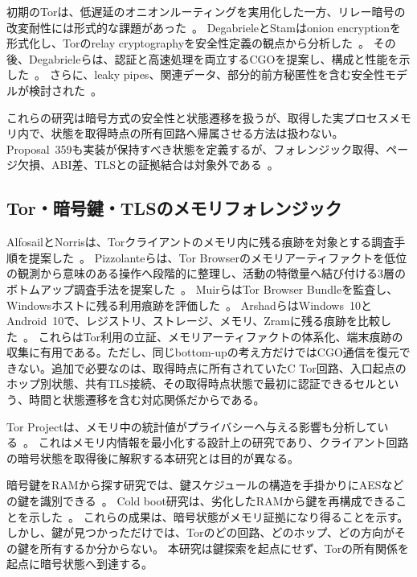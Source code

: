 \documentclass[10pt,a4paper]{ltjsarticle}
\begin{document}
初期のTorは、低遅延のオニオンルーティングを実用化した一方、リレー暗号の改変耐性には形式的な課題があった~\cite{dingledine2004tor}。
DegabrieleとStamはonion encryptionを形式化し、Torのrelay cryptographyを安全性定義の観点から分析した~\cite{degabriele2018untagging}。
その後、Degabrieleらは、認証と高速処理を両立するCGOを提案し、構成と性能を示した~\cite{degabriele2025cgo}。
さらに、leaky pipes、関連データ、部分的前方秘匿性を含む安全性モデルが検討された~\cite{degabriele2025secure}。

これらの研究は暗号方式の安全性と状態遷移を扱うが、取得した実プロセスメモリ内で、状態を取得時点の所有回路へ帰属させる方法は扱わない。
Proposal~359も実装が保持すべき状態を定義するが、フォレンジック取得、ページ欠損、ABI差、TLSとの証拠結合は対象外である~\cite{torproposal359}。

\subsection{Tor・暗号鍵・TLSのメモリフォレンジック}

AlfosailとNorrisは、Torクライアントのメモリ内に残る痕跡を対象とする調査手順を提案した~\cite{alfosail2021tor}。
Pizzolanteらは、Tor Browserのメモリアーティファクトを低位の観測から意味のある操作へ段階的に整理し、活動の特徴量へ結び付ける3層のボトムアップ調査手法を提案した~\cite{pizzolante2021torbrowser}。
MuirらはTor Browser Bundleを監査し、Windowsホストに残る利用痕跡を評価した~\cite{muir2019forensic}。
ArshadらはWindows~10とAndroid~10で、レジストリ、ストレージ、メモリ、Zramに残る痕跡を比較した~\cite{arshad2021forensic}。
これらはTor利用の立証、メモリアーティファクトの体系化、端末痕跡の収集に有用である。ただし、同じbottom-upの考え方だけではCGO通信を復元できない。追加で必要なのは、取得時点に所有されていたC Tor回路、入口起点のホップ別状態、共有TLS接続、その取得時点状態で最初に認証できるセルという、時間と状態遷移を含む対応関係だからである。

Tor Projectは、メモリ中の統計値がプライバシーへ与える影響も分析している~\cite{tor2017memory}。
これはメモリ内情報を最小化する設計上の研究であり、クライアント回路の暗号状態を取得後に解釈する本研究とは目的が異なる。


暗号鍵をRAMから探す研究では、鍵スケジュールの構造を手掛かりにAESなどの鍵を識別できる~\cite{maartmannmoe2009persistence}。
Cold boot研究は、劣化したRAMから鍵を再構成できることを示した~\cite{halderman2008coldboot}。
これらの成果は、暗号状態がメモリ証拠になり得ることを示す。
しかし、鍵が見つかっただけでは、Torのどの回路、どのホップ、どの方向がその鍵を所有するか分からない。
本研究は鍵探索を起点にせず、Torの所有関係を起点に暗号状態へ到達する。
\end{document}
